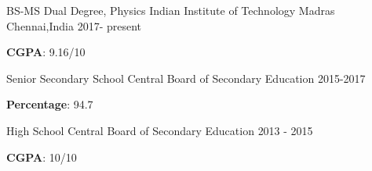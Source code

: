

\begin{cventries}

  \cventry
    {BS-MS Dual Degree, Physics} %
    {Indian Institute of Technology Madras} %
    {Chennai,India} %
    {2017- present} %
    {
      \begin{cvitems} %
        \item {\textbf{CGPA}: 9.16/10}
      \end{cvitems}
    }

  \cventry
    {Senior Secondary School} %
    {Central Board of Secondary Education} %
    {} %
    {2015-2017} %
    {
      \begin{cvitems} %
        \item {\textbf{Percentage}: 94.7}
      \end{cvitems}
    }

  \cventry
    {High School} %
    {Central Board of Secondary Education} %
    {} %
    {2013 - 2015} %
    {
      \begin{cvitems} %
        \item {\textbf{CGPA}: 10/10}
      \end{cvitems}
    }

\end{cventries}
